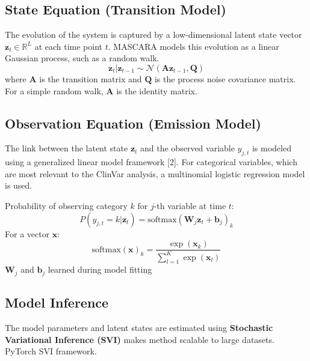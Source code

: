 \documentclass[../main.tex]{subfiles}
\begin{document}
\subsection{State Equation (Transition Model)}
The evolution of the system is captured by a low-dimensional latent state vector $\mathbf{z}_t \in \mathbb{R}^L$ at each time point $t$. MASCARA models this evolution as a linear Gaussian process, such as a random walk.
\begin{equation}
    \mathbf{z}_t | \mathbf{z}_{t-1} \sim \mathcal{N}(\mathbf{A} \mathbf{z}_{t-1}, \mathbf{Q})
\end{equation}
where $\mathbf{A}$ is the transition matrix and $\mathbf{Q}$ is the process noise covariance matrix. For a simple random walk, $\mathbf{A}$ is the identity matrix.

\subsection{Observation Equation (Emission Model)}
The link between the latent state $\mathbf{z}_t$ and the observed variable $y_{j,t}$ is modeled using a generalized linear model framework [2]. For categorical variables, which are most relevant to the ClinVar analysis, a multinomial logistic regression model is used.

Probability of observing category $k$ for $j$-th variable at time $t$:
\begin{equation}
    P(y_{j,t} = k | \mathbf{z}_t) = \text{softmax}(\mathbf{W}_j \mathbf{z}_t + \mathbf{b}_j)_k
\end{equation}
For a vector $\mathbf{x}$:
\begin{equation}
    \text{softmax}(\mathbf{x})_k = \frac{\exp(\mathbf{x}_k)}{\sum_{l=1}^{K} \exp(\mathbf{x}_l)}
\end{equation}
$\mathbf{W}_j$ and $\mathbf{b}_j$ learned during model fitting

\subsection{Model Inference} 
The model parameters and latent states are estimated using \textbf{Stochastic Variational Inference (SVI)} makes method scalable to large datasets. PyTorch SVI framework.
\end{document}
